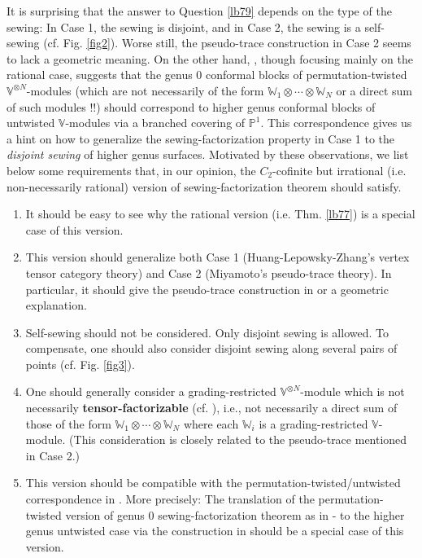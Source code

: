 \documentclass[11pt,b5paper,notitlepage]{article}
\theoremstyle{definition}
\theoremstyle{plain}
\newcommand{\Vbb}{\mathbb V}
\newcommand{\Wbb}{\mathbb W}
\newcommand{\Pbb}{\mathbb P}
\newcommand{\<}{\left\langle}
\renewcommand{\>}{\right\rangle}
\numberwithin{equation}{subsection}
\begin{document}
It is surprising that the answer to Question \ref{lb79} depends on the type of the sewing: In Case 1, the sewing is disjoint, and in Case 2, the sewing is a self-sewing (cf. Fig. \ref{fig2}). Worse still, the pseudo-trace construction in Case 2 seems to lack a geometric meaning. On the other hand, \cite{Gui-permutation}, though focusing mainly on the rational case, suggests that the genus $0$ conformal blocks of permutation-twisted $\Vbb^{\otimes N}$-modules (which are not necessarily of the form $\Wbb_1\otimes\cdots\otimes\Wbb_N$ or a direct sum of such modules !!) should correspond to higher genus conformal blocks of untwisted $\Vbb$-modules via a branched covering of $\Pbb^1$. This correspondence gives us a hint on how to generalize the sewing-factorization property in Case 1 to the \emph{disjoint sewing} of higher genus surfaces. Motivated by these observations, we list below some requirements that, in our opinion, the $C_2$-cofinite but irrational (i.e. non-necessarily rational) version of sewing-factorization theorem should satisfy.
\begin{enumerate}[align=left, label=R\arabic*.]
\item It should be easy to see why the rational version (i.e. Thm. \ref{lb77}) is a special case of this version.
\item This version should generalize both Case 1 (Huang-Lepowsky-Zhang's vertex tensor category theory) and Case 2 (Miyamoto's pseudo-trace theory). In particular, it should give the pseudo-trace construction in \cite{Miy-modular-invariance} or \cite{AN-pseudo-trace} a geometric explanation.
\item Self-sewing should not be considered. Only disjoint sewing is allowed. To compensate, one should also consider disjoint sewing along several pairs of points (cf. Fig. \ref{fig3}).
\item One should generally consider a grading-restricted $\Vbb^{\otimes N}$-module which is not necessarily \textbf{tensor-factorizable} (cf. \cite{Gui-permutation}), i.e., not necessarily a direct sum of those of the form $\Wbb_1\otimes\cdots\otimes\Wbb_N$ where each $\Wbb_i$ is a grading-restricted $\Vbb$-module. (This consideration is closely related to the pseudo-trace mentioned in Case 2.)
\item This version should be compatible with the permutation-twisted/untwisted correspondence in \cite{Gui-permutation}. More precisely: The translation of the permutation-twisted version of genus $0$ sewing-factorization theorem as in \cite{HLZ1,HLZ2}-\cite{HLZ8} to the higher genus untwisted case via the construction in \cite{Gui-permutation} should be a special case of this version.
\end{enumerate}
\end{document}
